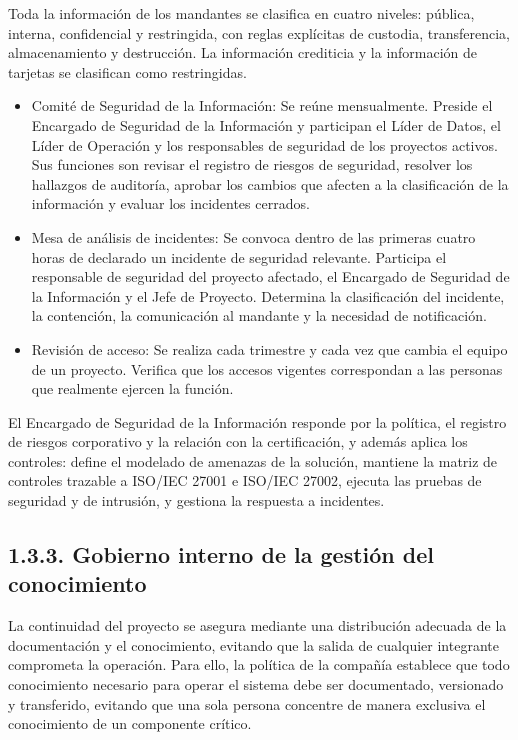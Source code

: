 \documentclass[11pt]{article}
\providecommand{\tightlist}{%
  \setlength{\itemsep}{0pt}\setlength{\parskip}{0pt}}
\begin{document}
Toda la información de los mandantes se clasifica en cuatro niveles: pública, interna, confidencial y restringida, con reglas explícitas de custodia, transferencia, almacenamiento y destrucción. La información crediticia y la información de tarjetas se clasifican como restringidas.

\begin{itemize}
\tightlist
\item
  Comité de Seguridad de la Información: Se reúne mensualmente. Preside el Encargado de Seguridad de la Información y participan el Líder de Datos, el Líder de Operación y los responsables de seguridad de los proyectos activos. Sus funciones son revisar el registro de riesgos de seguridad, resolver los hallazgos de auditoría, aprobar los cambios que afecten a la clasificación de la información y evaluar los incidentes cerrados.
\item
  Mesa de análisis de incidentes: Se convoca dentro de las primeras cuatro horas de declarado un incidente de seguridad relevante. Participa el responsable de seguridad del proyecto afectado, el Encargado de Seguridad de la Información y el Jefe de Proyecto. Determina la clasificación del incidente, la contención, la comunicación al mandante y la necesidad de notificación.
\item
  Revisión de acceso: Se realiza cada trimestre y cada vez que cambia el equipo de un proyecto. Verifica que los accesos vigentes correspondan a las personas que realmente ejercen la función.
\end{itemize}

El Encargado de Seguridad de la Información responde por la política, el registro de riesgos corporativo y la relación con la certificación, y además aplica los controles: define el modelado de amenazas de la solución, mantiene la matriz de controles trazable a ISO/IEC 27001 e ISO/IEC 27002, ejecuta las pruebas de seguridad y de intrusión, y gestiona la respuesta a incidentes.

\subsection{1.3.3. Gobierno interno de la gestión del conocimiento}\label{gobierno-interno-de-la-gestiuxf3n-del-conocimiento}

La continuidad del proyecto se asegura mediante una distribución adecuada de la documentación y el conocimiento, evitando que la salida de cualquier integrante comprometa la operación. Para ello, la política de la compañía establece que todo conocimiento necesario para operar el sistema debe ser documentado, versionado y transferido, evitando que una sola persona concentre de manera exclusiva el conocimiento de un componente crítico.
\end{document}
